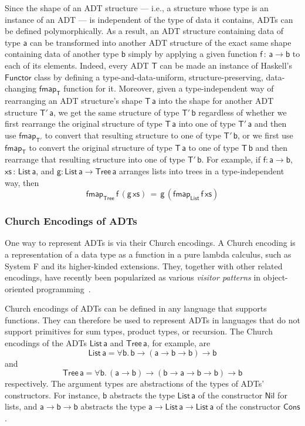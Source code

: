 \documentclass[acmsmall,screen,review,anonymous]{acmart}
\theoremstyle{definition}
\begin{document}
Since the shape of an ADT structure --- i.e., a structure whose type
is an instance of an ADT --- is independent of the type of data it
contains, ADTs can be defined polymorphically. As a result, an ADT
structure containing data of type $\mathsf{a}$ can be transformed into
another ADT structure of the exact same shape containing data of
another type $\mathsf{b}$ simply by applying a given function
$\mathsf{f \,:\,a \to b}$ to each of its elements. Indeed, every ADT
$\mathsf{T}$ can be made an instance of Haskell's $\mathsf{Functor}$
class by defining a type-and-data-uniform, structure-preserving,
data-changing $\mathsf{fmap_T}$ function for it.  Moreover, given a
type-independent way of rearranging an ADT structure's shape
$\mathsf{T\,a}$ into the shape for another ADT structure
$\mathsf{T'\,a}$, we get the same structure of type $\mathsf{T'\,b}$
regardless of whether we first rearrange the original structure of
type $\mathsf{T\,a}$ into one of type $\mathsf{T'\,a}$ and then use
$\mathsf{fmap_{T'}}$ to convert that resulting structure to one of
type $\mathsf{T'\,b}$, or we first use $\mathsf{fmap_T}$ to convert
the original structure of type $\mathsf{T\,a}$ to one of type
$\mathsf{T\,b}$ and then rearrange that resulting structure into one
of type $\mathsf{T'\,b}$. For example, if $\mathsf{f : a \to b}$,
$\mathsf{xs \,:\,List\,a}$, and $\mathsf{g : List\,a\to Tree\,a}$
arranges lists into trees in a type-independent way, then
\[\mathsf{fmap_{Tree}\,f\,(g \, xs) \,=\, g\,(fmap_{List}\,f\,xs)}\]

\subsubsection{Church Encodings of ADTs}

One way to represent ADTs is via their Church encodings. A Church
encoding is a representation of a data type as a function in a pure
lambda calculus, such as System F and its higher-kinded
extensions. They, together with other related encodings, have recently
been popularized as various {\em visitor patterns} in object-oriented
programming~\cite{owg08,gon21}.

Church encodings of ADTs can be defined in any language that supports
functions. They can therefore be used to represent ADTs in languages
that do not support primitives for sum types, product types, or
recursion. The Church encodings of the ADTs $\mathsf{List\,a}$ and
$\mathsf{Tree\,a}$, for example, are
\[\mathsf{List\,a} = \mathsf{\forall b.\,b \to (a \to b \to b) \to b}\]
and 
\[\mathsf{Tree\,a} = \mathsf{\forall b.\,(a \to b) \to (b \to a \to b
  \to b) \to b}\] respectively. The argument types are abstractions of
the types of ADTs' constructors. For instance, $\mathsf{b}$ abstracts
the type $\mathsf{List\,a}$ of the constructor $\mathsf{Nil}$ for
lists, and $\mathsf{a \to b \to b}$ abstracts the type $\mathsf{a \to
  List\,a \to List\,a}$ of the constructor $\mathsf{Cons}$.
\end{document}
